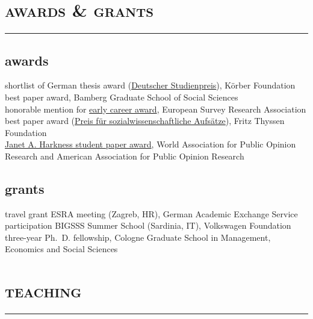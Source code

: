 \documentclass[11pt, a4paper]{article}
\begin{document}
\section*{\textsc{awards \& grants}}
\vskip-20pt{\noindent\rule{\textwidth}{1pt}}
\subsection*{awards}
shortlist of German thesis award (\href{https://www.koerber-stiftung.de/fileadmin/user_upload/koerber-stiftung/redaktion/deutscher-studienpreis/pdf/2019/2019_Nominierte_SozialWissenschaften.pdf}{Deutscher Studienpreis}), Körber Foundation\\
best paper award, Bamberg Graduate School of Social Sciences\\
honorable mention for \href{https://www.europeansurveyresearch.org/awards/prize}{early career award}, European Survey Research Association\\
best paper award (\href{https://www.fritz-thyssen-stiftung.de/cms/wp-content/uploads/2018/06/Jahresbericht_2017_interaktiv.pdf}{Preis für sozialwissenschaftliche Aufsätze}), Fritz Thyssen Foundation\\
\href{https://wapor.org/events/annual-conference/awards-funds/janet-a-harkness-student-paper-award/}{Janet A. Harkness student paper award}, World Association for Public Opinion Research and American Association for Public Opinion Research\\
\subsection*{grants}
travel grant ESRA meeting (Zagreb, HR), German Academic Exchange Service\\
participation BIGSSS Summer School (Sardinia, IT), Volkswagen Foundation\\
three-year Ph.~D. fellowship, Cologne Graduate School in Management, Economics and Social Sciences
\section*{\textsc{teaching}}
\vskip-20pt{\noindent\rule{\textwidth}{1pt}}
\noindent
\end{document}
